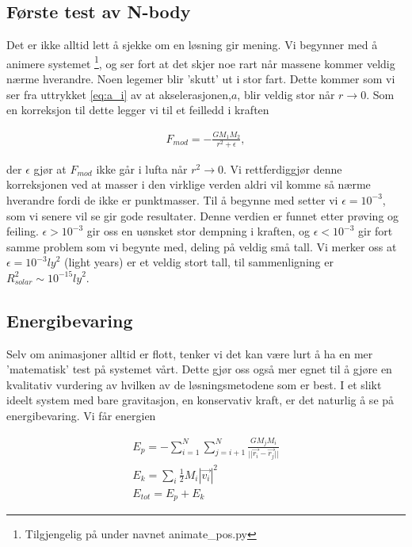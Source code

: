 \documentclass[11pt]{article}
\begin{document}
\begin{multicols}{2}

\subsection{Første test av N-body}
\label{sec:forste-test-epsilon}
Det er ikke alltid lett å sjekke om en løsning gir mening. Vi begynner med
å animere systemet \footnote{Tilgjengelig på \cite{github-repo} under navnet
animate\_pos.py}, og ser fort at det skjer noe rart når massene kommer veldig
nærme hverandre. Noen legemer blir 'skutt' ut i stor fart. Dette kommer som
vi ser fra uttrykket \eqref{eq:a_i} av at akselerasjonen,$a$, blir veldig
stor når $r \rightarrow 0$.
Som en korreksjon til dette legger vi til et feilledd i kraften

\begin{align}
F_{mod} = -\frac{GM_1M_2}{r^2 + \epsilon},
\end{align}

der $\epsilon$ gjør at $F_{mod}$ ikke går i lufta når $r^2 \rightarrow 0$. Vi 
rettferdiggjør denne korreksjonen ved at masser i den virklige
verden aldri vil komme så nærme hverandre fordi de ikke er punktmasser.
Til å begynne med setter vi $\epsilon = 10^{-3}$, som vi senere vil se gir
gode resultater. Denne verdien er funnet etter prøving og feiling. 
$\epsilon > 10^{-3}$ gir oss en uønsket stor dempning i kraften, og 
$\epsilon < 10^{-3}$ gir fort samme problem som vi begynte med, deling på
veldig små tall. Vi merker oss at $\epsilon = 10^{-3} {ly}^2$ (light years) er et veldig 
stort tall, til sammenligning er $R_{solar}^2 \sim 10^{-15} {ly}^2$. 

\subsection{Energibevaring}
Selv om animasjoner alltid er flott, tenker vi det kan være lurt å ha en mer
'matematisk' test på systemet vårt. Dette gjør oss også mer egnet til
å gjøre en kvalitativ vurdering av hvilken av de løsningsmetodene som er best.
I et slikt ideelt system med bare 
gravitasjon, en konservativ kraft, er det naturlig å se på energibevaring. Vi får
energien

\begin{align}
E_{p} = - \sum_{i = 1}^{N} \sum_{j = i+1}^{N} \frac{GM_jM_i}{{||\vec{r_i} - \vec{r_j}||}} \\
E_{k} = \sum_{i} \frac{1}{2}M_i|\vec{v_i}|^2 \\
E_{tot} = E_{p} + E_{k}
\end{align}


\end{multicols}
\end{document}
